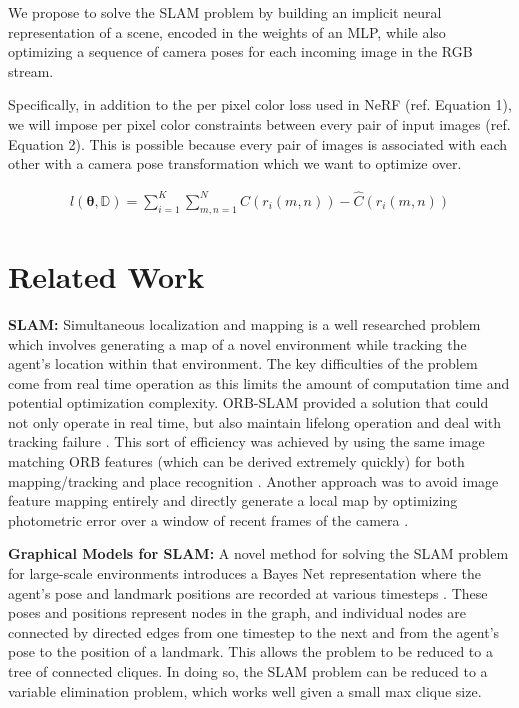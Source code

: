 \documentclass[15pt,letterpaper]{article}
\newcommand{\Db}{\mathbb{D}}
\newcommand{\thetav     }{\boldsymbol \theta     }
\begin{document}
We propose to solve the SLAM problem by building an implicit neural representation of a scene, encoded in the weights of an MLP, while also optimizing a sequence of camera poses for each incoming image in the RGB stream.

Specifically, in addition to the per pixel color loss used in NeRF (ref. Equation 1), we will impose per pixel color constraints between every pair of input images (ref. Equation 2). This is possible because every pair of images is associated with each other with a camera pose transformation which we want to optimize over.

\begin{align}
    l(\thetav, \Db) = \sum_{i = 1}^{K} \sum_{m,n = 1}^{N} C(r_i(m, n)) - \hat{C}(r_i(m,n))
\end{align}

\section{Related Work}%
\label{sec:Related Work}
{\bf SLAM:}
Simultaneous localization and mapping is a well researched problem which involves generating a map of a novel environment while tracking the agent's location within that environment. The key difficulties of the problem come from real time operation as this limits the amount of computation time and potential optimization complexity. ORB-SLAM provided a solution that could not only operate in real time, but also maintain lifelong operation and deal with tracking failure \cite{orb_slam}. This sort of efficiency was achieved by using the same image matching ORB features (which can be derived extremely quickly) for both mapping/tracking and place recognition \cite{orb}. Another approach was to avoid image feature mapping entirely and directly generate a local map by optimizing photometric error over a window of recent frames of the camera \cite{direct_odometry}.

{\bf Graphical Models for SLAM:}
A novel method for solving the SLAM problem for large-scale environments introduces a Bayes Net representation where the agent's pose and landmark positions are recorded at various timesteps \cite{isam2}. These poses and positions represent nodes in the graph, and individual nodes are connected by directed edges from one timestep to the next and from the agent's pose to the position of a landmark. This allows the problem to be reduced to a tree of connected cliques. In doing so, the SLAM problem can be reduced to a variable elimination problem, which works well given a small max clique size.
\end{document}
